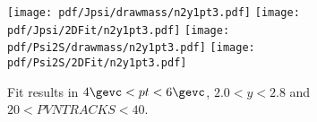\begin{figure}[H]
\begin{center}
\texttt{[image: pdf/Jpsi/drawmass/n2y1pt3.pdf]}
\texttt{[image: pdf/Jpsi/2DFit/n2y1pt3.pdf]}
\vspace*{-0.5cm}
\texttt{[image: pdf/Psi2S/drawmass/n2y1pt3.pdf]}
\texttt{[image: pdf/Psi2S/2DFit/n2y1pt3.pdf]}
\vspace*{-0.5cm}
\end{center}
\caption{Fit results in $4\gevc<pt<6\gevc$, $2.0<y<2.8$ and $20<PVNTRACKS<40$.}
\label{Fitn2y1pt3}
\end{figure}

